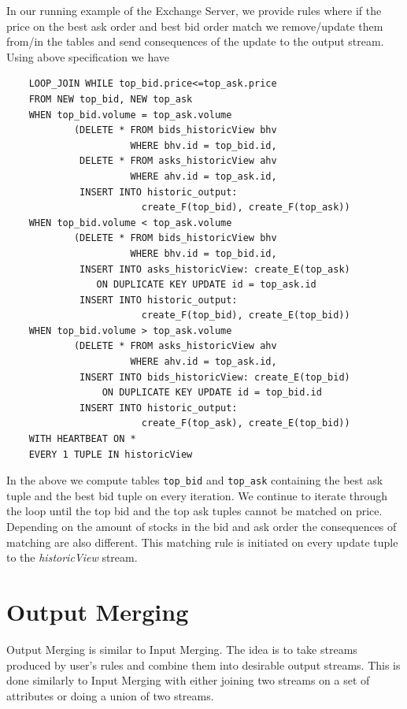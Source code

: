 \documentclass{article}
\begin{document}
In our running example of the Exchange Server, we provide rules where if the price on the best ask order and best bid order match we remove/update them from/in the tables and send consequences of the update to the output stream. Using above specification we have

\begin{verbatim}  
    LOOP_JOIN WHILE top_bid.price<=top_ask.price
    FROM NEW top_bid, NEW top_ask
    WHEN top_bid.volume = top_ask.volume 
            (DELETE * FROM bids_historicView bhv 
                      WHERE bhv.id = top_bid.id,
             DELETE * FROM asks_historicView ahv 
                      WHERE ahv.id = top_ask.id,
             INSERT INTO historic_output: 
                        create_F(top_bid), create_F(top_ask))
    WHEN top_bid.volume < top_ask.volume 
            (DELETE * FROM bids_historicView bhv 
                      WHERE bhv.id = top_bid.id,
             INSERT INTO asks_historicView: create_E(top_ask) 
                ON DUPLICATE KEY UPDATE id = top_ask.id
             INSERT INTO historic_output:
                        create_F(top_bid), create_E(top_bid))
    WHEN top_bid.volume > top_ask.volume 
            (DELETE * FROM asks_historicView ahv 
                      WHERE ahv.id = top_ask.id,
             INSERT INTO bids_historicView: create_E(top_bid) 
                 ON DUPLICATE KEY UPDATE id = top_bid.id
             INSERT INTO historic_output:
                        create_F(top_ask), create_E(top_bid))
    WITH HEARTBEAT ON *
    EVERY 1 TUPLE IN historicView
\end{verbatim}

In the above we compute tables {\tt top\_bid} and {\tt top\_ask} containing the best ask tuple and the best bid tuple on every iteration. We continue to iterate through the loop until the top bid and the top ask tuples cannot be matched on price. Depending on the amount of stocks in the bid and ask order the consequences of matching are also different. This matching rule is initiated on every update tuple to the \emph{historicView} stream. 


\section{Output Merging}

Output Merging is similar to Input Merging. The idea is to take streams produced by user's rules and combine them into desirable output streams. This is done similarly to Input Merging with either joining two streams on a set of attributes or doing a union of two streams.  
\end{document}
